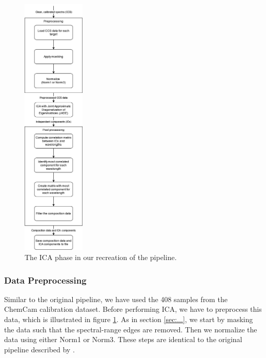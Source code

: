 
\begin{figure}
	\centering
	\includegraphics[width=0.2675\textwidth]{images/ica_data.png}
	\caption{The ICA phase in our recreation of the pipeline.}
	\label{fig:ica_data}
\end{figure}

\subsubsection{Data Preprocessing}
Similar to the original pipeline, we have used the 408 samples from the ChemCam calibration dataset.
Before performing ICA, we have to preprocess this data, which is illustrated in figure \ref{fig:ica_data}.
As in section \ref{sec:...}, we start by masking the data such that the spectral-range edges are removed. %
Then we normalize the data using either Norm1 or Norm3.
These steps are identical to the original pipeline described by \citeauthor{cleggRecalibrationMarsScience2017}.

